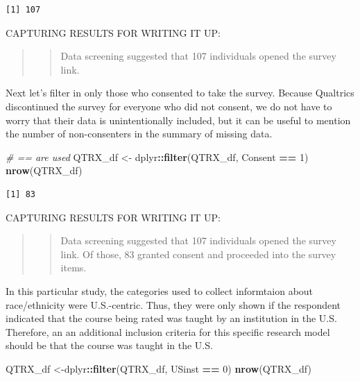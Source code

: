 \documentclass[
  11pt,
]{book}
\newenvironment{Shaded}{\begin{snugshade}}{\end{snugshade}}
\newcommand{\CommentTok}[1]{\textcolor[rgb]{0.37,0.37,0.37}{\textit{#1}}}
\newcommand{\DecValTok}[1]{\textcolor[rgb]{0.06,0.06,0.06}{#1}}
\newcommand{\FunctionTok}[1]{\textcolor[rgb]{0.27,0.27,0.27}{\textbf{#1}}}
\newcommand{\NormalTok}[1]{#1}
\newcommand{\OtherTok}[1]{\textcolor[rgb]{0.37,0.37,0.37}{#1}}
\newcommand{\SpecialCharTok}[1]{\textcolor[rgb]{0.43,0.43,0.43}{\textbf{#1}}}
\begin{document}
\begin{verbatim}
[1] 107
\end{verbatim}

CAPTURING RESULTS FOR WRITING IT UP:

\begin{quote}
\begin{quote}
Data screening suggested that 107 individuals opened the survey link.
\end{quote}
\end{quote}

Next let's filter in only those who consented to take the survey. Because Qualtrics discontinued the survey for everyone who did not consent, we do not have to worry that their data is unintentionally included, but it can be useful to mention the number of non-consenters in the summary of missing data.

\begin{Shaded}
\begin{Highlighting}[]
\CommentTok{\# == are used}
\NormalTok{QTRX\_df }\OtherTok{\textless{}{-}}\NormalTok{ dplyr}\SpecialCharTok{::}\FunctionTok{filter}\NormalTok{(QTRX\_df, Consent }\SpecialCharTok{==} \DecValTok{1}\NormalTok{)}
\FunctionTok{nrow}\NormalTok{(QTRX\_df)}
\end{Highlighting}
\end{Shaded}

\begin{verbatim}
[1] 83
\end{verbatim}

CAPTURING RESULTS FOR WRITING IT UP:

\begin{quote}
\begin{quote}
Data screening suggested that 107 individuals opened the survey link. Of those, 83 granted consent and proceeded into the survey items.
\end{quote}
\end{quote}

In this particular study, the categories used to collect informtaion about race/ethnicity were U.S.-centric. Thus, they were only shown if the respondent indicated that the course being rated was taught by an institution in the U.S. Therefore, an an additional inclusion criteria for this specific research model should be that the course was taught in the U.S.

\begin{Shaded}
\begin{Highlighting}[]
\NormalTok{QTRX\_df }\OtherTok{\textless{}{-}}\NormalTok{dplyr}\SpecialCharTok{::}\FunctionTok{filter}\NormalTok{(QTRX\_df, USinst }\SpecialCharTok{==} \DecValTok{0}\NormalTok{)}
\FunctionTok{nrow}\NormalTok{(QTRX\_df)}
\end{Highlighting}
\end{Shaded}
\end{document}
